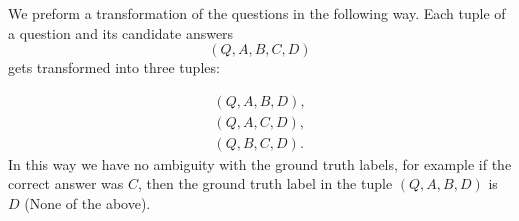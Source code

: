 We preform a transformation of the questions in the following way. Each tuple of a question and 
its candidate answers
$$
    (Q,A,B,C,D)
$$
gets transformed into three tuples:

\begin{align*}
       (Q,A,B,D), \\
       (Q,A,C,D), \\
       (Q,B,C,D).
\end{align*}
In this way we have no ambiguity with the ground truth labels, for example if the correct answer was
$C$, then the ground truth label in the tuple $(Q,A,B,D)$ is $D$  (None of the above).  

